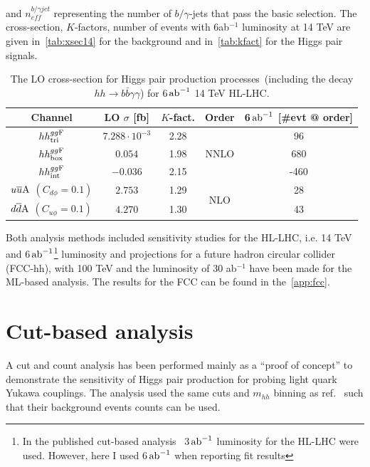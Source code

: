 and $n_{eff}^{b/\gamma jet}$ representing the number of $b/\gamma$-jets that pass the basic selection. The cross-section, $K$-factors, number of events with 6ab$^{-1}$ luminosity at 14 TeV are given in~\autoref{tab:xsec14} for the background and in~\autoref{tab:kfact} for the Higgs pair signals. 
\begin{table}[t]
	\centering
	\begin{tabular}{ccccc}
		\toprule
		Channel	        &LO $\sigma $ [fb]	&$K$-fact.	&Order&6$\,{\rm ab}^{-1}$ [\#evt @ order]   \\
		\midrule
		$hh^{gg\rm F}_{\rm tri}$	        &  $7.288 \cdot10^{-3}$    & 2.28 &\multirow{3}{*}{NNLO}   &  96   \\ 
		$hh^{gg\rm F}_{\rm box}$            & $0.054$    & 1.98 &  & 680   \\ 
		$hh^{gg\rm F}_{\rm int}$            &$-0.036$    & 2.15 &  &-460   \\ 
		$u\overline u \rm A$ $(C_{d\phi}=0.1)$ &  $2.753$    & 1.29&\multirow{2}{*}{NLO} &  28   \\ 
		$d\overline d \rm A$ $(C_{u\phi}=0.1)$ &  $4.270$    & 1.30 & &  43   \\ 
		\bottomrule
	\end{tabular}
	\caption{  The LO cross-section for Higgs pair production processes~(including the decay $hh \to b \bar b \gamma \gamma$) for 6$\,{\rm ab}^{-1}$ 14 TeV HL-LHC.}
	\label{tab:kfact}
\end{table}
\par Both analysis methods included sensitivity studies for the HL-LHC, i.e. 14 TeV and 6$\,{\rm ab}^{-1}$\footnote{In the published cut-based analysis~\cite{Alasfar:2019pmn} 3$\,{\rm ab}^{-1}$ luminosity for the HL-LHC were used. However, here I used 6$\,{\rm ab}^{-1}$ when reporting fit results} luminosity and projections for a future hadron circular collider (FCC-hh), with 100 TeV and the luminosity of 30 ab$^{-1}$ have been made for the ML-based analysis. The results for the FCC can be found in the~\autoref{app:fcc}.

\section{Cut-based analysis \label{sec:cutbasedly}}
\apr A cut and count analysis has been performed mainly as a ``proof of concept'' to demonstrate the sensitivity of Higgs pair production for probing light quark Yukawa couplings.  The analysis used the same cuts and $m_{hh}$ binning as ref.~\cite{Azatov:2015oxa} such that their background events counts can be used. 

